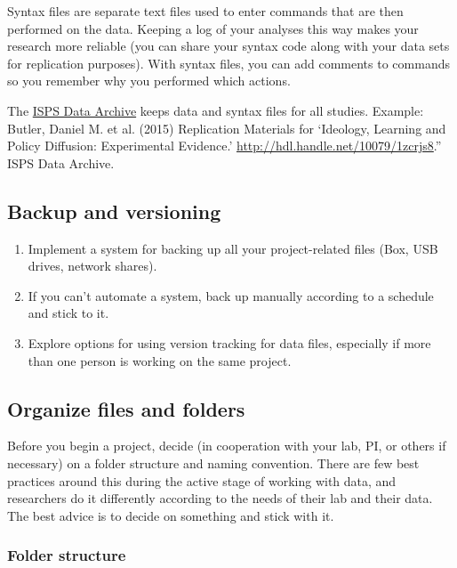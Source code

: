 Syntax files are separate text files used to enter commands that are
then performed on the data. Keeping a log of your analyses this way
makes your research more reliable (you can share your syntax code along
with your data sets for replication purposes). With syntax files, you
can add comments to commands so you remember why you performed which
actions.

The \href{http://isps.yale.edu/research/data}{ISPS Data Archive} keeps
data and syntax files for all studies. Example: Butler, Daniel M. et al.
(2015) Replication Materials for `Ideology, Learning and Policy
Diffusion: Experimental Evidence.'
\url{http://hdl.handle.net/10079/1zcrjs8}.'' ISPS Data Archive.

\subsection{Backup and versioning}\label{backup-and-versioning}

\begin{enumerate}
\def\labelenumi{\arabic{enumi}.}
\tightlist
\item
  Implement a system for backing up all your project-related files (Box,
  USB drives, network shares).
\item
  If you can't automate a system, back up manually according to a
  schedule and stick to it.
\item
  Explore options for using version tracking for data files, especially
  if more than one person is working on the same project.
\end{enumerate}

\subsection{Organize files and
folders}\label{organize-files-and-folders}

Before you begin a project, decide (in cooperation with your lab, PI, or
others if necessary) on a folder structure and naming convention. There
are few best practices around this during the active stage of working
with data, and researchers do it differently according to the needs of
their lab and their data. The best advice is to decide on something and
stick with it.

\subsubsection{Folder structure}\label{folder-structure}

